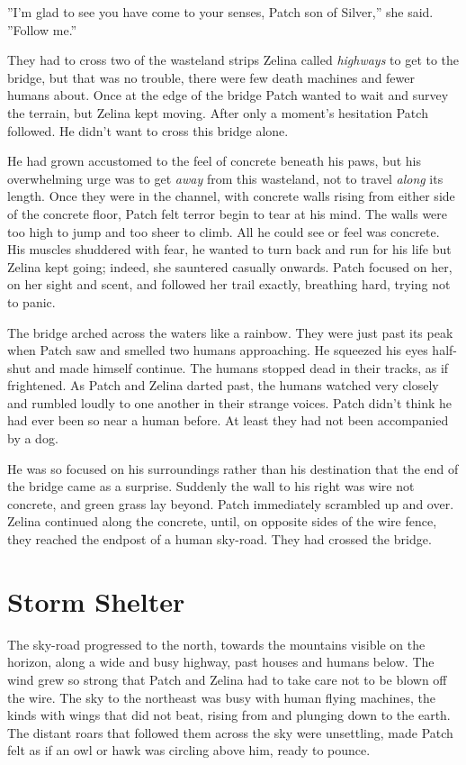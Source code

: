 \documentclass[12pt]{book}
\begin{document}
''I'm glad to see you have come to your senses, Patch son of Silver,'' she said. ''Follow me.''

They had to cross two of the wasteland strips Zelina called {\it highways} to get to the bridge, but that was no trouble, there were few death machines and fewer humans about. Once at the edge of the bridge Patch wanted to wait and survey the terrain, but Zelina kept moving. After only a moment's hesitation Patch followed. He didn't want to cross this bridge alone.

He had grown accustomed to the feel of concrete beneath his paws, but his overwhelming urge was to get {\it away} from this wasteland, not to travel {\it along} its length. Once they were in the channel, with concrete walls rising from either side of the concrete floor, Patch felt terror begin to tear at his mind. The walls were too high to jump and too sheer to climb. All he could see or feel was concrete. His muscles shuddered with fear, he wanted to turn back and run for his life %
but Zelina kept going; indeed, she sauntered casually onwards. Patch focused on her, on her sight and scent, and followed her trail exactly, breathing hard, trying not to panic.

The bridge arched across the waters like a rainbow. They were just past its peak when Patch saw and smelled two humans approaching. He squeezed his eyes half-shut and made himself continue. The humans stopped dead in their tracks, as if frightened. As Patch and Zelina darted past, the humans watched very closely and rumbled loudly to one another in their strange voices. Patch didn't think he had ever been so near a human before. At least they had not been accompanied by a dog.

He was so focused on his surroundings rather than his destination that the end of the bridge came as a surprise. Suddenly the wall to his right was wire not concrete, and green grass lay beyond. Patch immediately scrambled up and over. Zelina continued along the concrete, until, on opposite sides of the wire fence, they reached the endpost of a human sky-road. They had crossed the bridge.


\section{Storm Shelter}

The sky-road progressed to the north, towards the mountains visible on the horizon, along a wide and busy highway, past houses and humans below. The wind grew so strong that Patch and Zelina had to take care not to be blown off the wire. The sky to the northeast was busy with human flying machines, the kinds with wings that did not beat, rising from and plunging down to the earth. The distant roars that followed them across the sky were unsettling, made Patch felt as if an owl or hawk was circling above him, ready to pounce.
\end{document}

